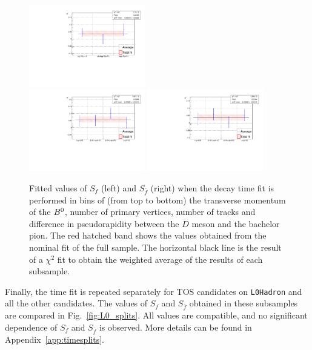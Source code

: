 \begin{figure}[htpb]
\begin{center}
                \includegraphics[width=0.45\textwidth]{05DecaytimeFit/figs/splits/Sfbar_splits_nTracks.pdf} \\
                \includegraphics[width=0.45\textwidth]{05DecaytimeFit/figs/splits/Sf_splits_DeltaEta.pdf}
                \includegraphics[width=0.45\textwidth]{05DecaytimeFit/figs/splits/Sfbar_splits_DeltaEta.pdf} \\
        \end{center}
        \vspace{-2mm}
        \caption{Fitted values of $S_f$ (left) and $S_{\bar f}$ (right) when the decay time fit is performed
        in bins of (from top to bottom) the transverse momentum of the $B^0$, number of primary vertices, number of tracks and difference
        in pseudorapidity between the $D$ meson and the bachelor pion. The red hatched band shows the values obtained from the nominal fit of the full sample. The horizontal black line is the result of a $\chi^2$ fit to obtain the weighted average of the results of each subsample.}
        \label{fig:kin_evt_splits}
\end{figure}

Finally, the time fit is repeated separately for TOS candidates on \verb!L0Hadron! and all the other candidates.
The values of $S_{f}$ and $S_{\bar{f}}$ obtained in these subsamples are compared in Fig.~\ref{fig:L0_splits}.
All values are compatible, and no significant dependence of $S_f$ and $S_{\bar f}$ is observed. More details can be found in Appendix~\ref{app:timesplits}.

